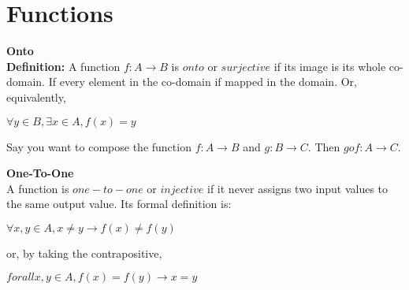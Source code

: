 \documentclass[a4paper]{article}
\begin{document}
\section{ Functions}
{\large {\bf Onto}}\\
{\bf Definition:} A function $f : A \rightarrow B$ is $onto$ or $surjective$ if its image is its whole co-domain. If every element in the co-domain if mapped in the domain. Or, equivalently,
\begin{center}
$\forall y\in B, \exists x \in A, f(x)=y$
\end{center}
Say you want to compose the function $f : A \rightarrow B$ and $g : B \rightarrow C$. Then $g o f: A \rightarrow C$.

{\large {\bf One-To-One}}\\
A function is $one-to-one$ or $injective$ if it never assigns two input values to the same output value. Its formal definition is:
\begin{center}
$\forall x,y \in A, x\neq y \rightarrow f(x) \neq f(y)$\\
\end{center}
or, by taking the contrapositive,
\begin{center}
$forall x,y\in A, f(x) = f(y) \rightarrow x=y$\\ 
\end{center}

\end{document}
